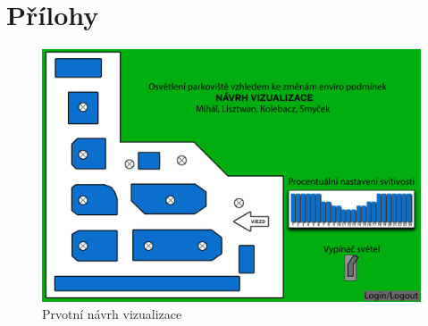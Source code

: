 \chapter{Přílohy}
\label{Sec-Prilohy}


\begin{figure}
    \centering\includegraphics[width=\textwidth]{Figures/Navrh-viz.png}   
    \caption{Prvotní návrh vizualizace}
    \label{Obr-Navrh-viz-01}
\end{figure}

\endinput